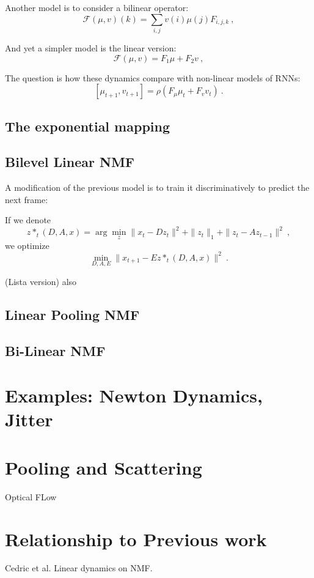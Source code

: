 \documentclass[11pt]{article} %
\begin{document}
Another model is to consider a bilinear operator:
$$\mathcal{F}(\mu, v)(k) = \sum_{i,j} v(i) \mu(j) F_{i,j,k}~,$$

And yet a simpler model is the linear version:
$$\mathcal{F}(\mu, v) = F_1 \mu + F_2 v~,$$

The question is how these dynamics compare with non-linear models of RNNs:
$$[\mu_{t+1}, v_{t+1}] = \rho( F_\mu \mu_t + F_v v_t)~.$$


\subsection{The exponential mapping} 


\subsection{Bilevel Linear NMF}

A modification of the previous model is to train it discriminatively to predict the next frame:

If we denote 
$$z*_t(D, A, x) = \arg \min_z \| x_t - D z_t \|^2 + \|z_t \|_1 +  \| z_t - A z_{t-1} \|^2~,$$
we optimize
$$\min_{D, A, E} \| x_{t+1} - E z*_t(D, A, x) \|^2~.$$

(Lista version) also 


\subsection{Linear Pooling NMF}

\subsection{Bi-Linear NMF}

\section{Examples: Newton Dynamics, Jitter}

\section{Pooling and Scattering}

Optical FLow

\section{Relationship to Previous work}

Cedric et al. Linear dynamics on NMF. 
\end{document}
